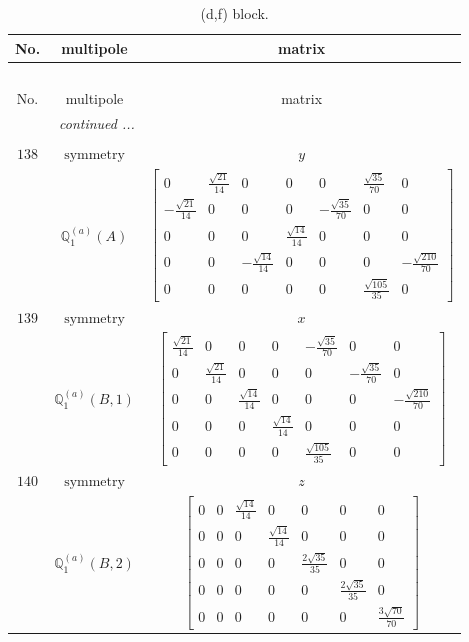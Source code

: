 \documentclass[fleqn,8pt,landscape]{jsarticle}
\begin{document}
\begin{longtable}{ccc}
\caption{(d,f) block.}
 \\
 \hline \hline
No. & multipole & matrix \\ \hline \endfirsthead

\multicolumn{2}{l}{\tablename\ \thetable{}} \\
 \hline \hline
No. & multipole & matrix \\ \hline \endhead

 \hline \hline
\multicolumn{2}{r}{\footnotesize\it continued ...} \\ \endfoot

 \hline \hline
\multicolumn{2}{r}{} \\ \endlastfoot

$ 138 $ & $ \text{symmetry} $ & $ y $ \\
$  $ & $ \mathbb{Q}_{1}^{(a)}(A) $ & $ \begin{bmatrix} 0 & \frac{\sqrt{21}}{14} & 0 & 0 & 0 & \frac{\sqrt{35}}{70} & 0 \\ - \frac{\sqrt{21}}{14} & 0 & 0 & 0 & - \frac{\sqrt{35}}{70} & 0 & 0 \\ 0 & 0 & 0 & \frac{\sqrt{14}}{14} & 0 & 0 & 0 \\ 0 & 0 & - \frac{\sqrt{14}}{14} & 0 & 0 & 0 & - \frac{\sqrt{210}}{70} \\ 0 & 0 & 0 & 0 & 0 & \frac{\sqrt{105}}{35} & 0 \end{bmatrix} $ \\ \hline
$ 139 $ & $ \text{symmetry} $ & $ x $ \\
$  $ & $ \mathbb{Q}_{1}^{(a)}(B,1) $ & $ \begin{bmatrix} \frac{\sqrt{21}}{14} & 0 & 0 & 0 & - \frac{\sqrt{35}}{70} & 0 & 0 \\ 0 & \frac{\sqrt{21}}{14} & 0 & 0 & 0 & - \frac{\sqrt{35}}{70} & 0 \\ 0 & 0 & \frac{\sqrt{14}}{14} & 0 & 0 & 0 & - \frac{\sqrt{210}}{70} \\ 0 & 0 & 0 & \frac{\sqrt{14}}{14} & 0 & 0 & 0 \\ 0 & 0 & 0 & 0 & \frac{\sqrt{105}}{35} & 0 & 0 \end{bmatrix} $ \\ \hline
$ 140 $ & $ \text{symmetry} $ & $ z $ \\
$  $ & $ \mathbb{Q}_{1}^{(a)}(B,2) $ & $ \begin{bmatrix} 0 & 0 & \frac{\sqrt{14}}{14} & 0 & 0 & 0 & 0 \\ 0 & 0 & 0 & \frac{\sqrt{14}}{14} & 0 & 0 & 0 \\ 0 & 0 & 0 & 0 & \frac{2 \sqrt{35}}{35} & 0 & 0 \\ 0 & 0 & 0 & 0 & 0 & \frac{2 \sqrt{35}}{35} & 0 \\ 0 & 0 & 0 & 0 & 0 & 0 & \frac{3 \sqrt{70}}{70} \end{bmatrix} $ \\ \hline

\end{longtable}
\end{document}
